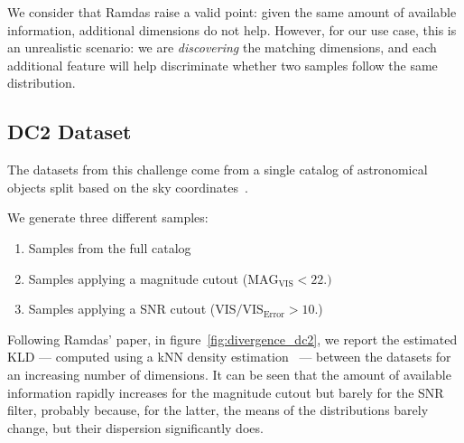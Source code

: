 We consider that Ramdas \etal raise a valid point: given the same amount of available
information, additional dimensions do not help. However, for our \PresQ use case, this is an
unrealistic scenario: we are \emph{discovering} the matching dimensions, and each additional
feature will help discriminate whether two samples follow the same distribution.

\subsection{DC2 Dataset}
The datasets from this challenge come from a single catalog of astronomical
objects split based on the sky coordinates~\cite{EuclidDesprez2020}.

We generate three different samples:

\begin{enumerate}
    \item Samples from the full catalog
    \item Samples applying a magnitude cutout ($\text{MAG}_\text{VIS} < 22.)$
    \item Samples applying a \gls{SNR} cutout ($\text{VIS} / \text{VIS}_\text{Error} > 10.$)
\end{enumerate}

Following Ramdas' paper, in figure~\ref{fig:divergence_dc2}, we report
the estimated \gls{KLD} --- computed using a \gls{kNN} density estimation~\cite{perez2008kullback} --- between the datasets for an
increasing number of dimensions.
It can be seen that the amount of available information
rapidly increases for the magnitude cutout but barely for the \gls{SNR} filter,
probably because, for the latter, the means of the distributions barely change,
but their dispersion significantly does.

